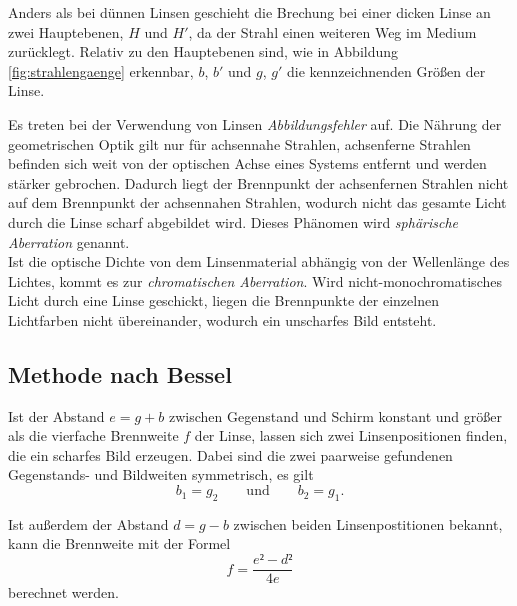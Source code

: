 Anders als bei dünnen Linsen geschieht die Brechung bei einer dicken Linse an zwei Hauptebenen, $H$ und $H'$, da der Strahl einen weiteren Weg im Medium zurücklegt.
Relativ zu den Hauptebenen sind, wie in Abbildung \ref{fig:strahlengaenge} erkennbar, $b$, $b'$ und $g$, $g'$ die kennzeichnenden Größen der Linse. 


Es treten bei der Verwendung von Linsen \emph{Abbildungsfehler} auf. 
Die Nährung der geometrischen Optik gilt nur für achsennahe Strahlen, achsenferne Strahlen befinden sich weit von der optischen Achse eines Systems entfernt und werden stärker gebrochen. 
Dadurch liegt der Brennpunkt der achsenfernen Strahlen nicht auf dem Brennpunkt der achsennahen Strahlen, wodurch nicht das gesamte Licht durch die Linse scharf abgebildet wird. Dieses Phänomen wird \emph{sphärische Aberration} genannt.\\
Ist die optische Dichte von dem Linsenmaterial abhängig von der Wellenlänge des Lichtes, kommt es zur \emph{chromatischen Aberration}. 
Wird nicht-monochromatisches Licht durch eine Linse geschickt, liegen die Brennpunkte der einzelnen Lichtfarben nicht übereinander, wodurch ein unscharfes Bild entsteht.

\subsection{Methode nach \texorpdfstring{Bessel}{\textsc{Bessel}}}
Ist der Abstand $e=g+b$ zwischen Gegenstand und Schirm konstant und größer als die vierfache Brennweite $f$ der Linse, lassen sich zwei Linsenpositionen finden, die ein scharfes Bild erzeugen. 
Dabei sind die zwei paarweise gefundenen Gegenstands- und Bildweiten symmetrisch, es gilt
\begin{equation}
	b_1=g_2 \qquad \text{und} \qquad b_2=g_1.
\end{equation}

Ist außerdem der Abstand $d=g-b$ zwischen beiden Linsenpostitionen bekannt, kann die Brennweite mit der Formel
\begin{equation}
	f=\frac{e²-d²}{4e}
\end{equation}
berechnet werden.

